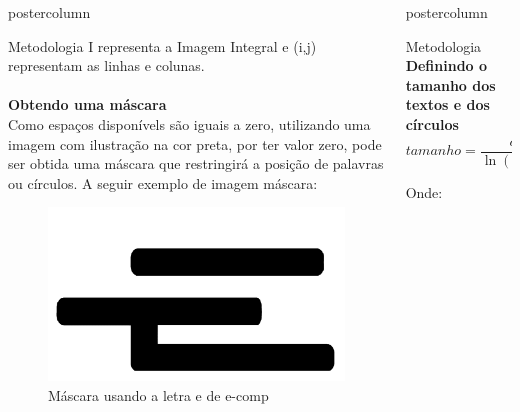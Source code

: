\documentclass[final,hyperref={pdfpagelabels=false}]{beamer}
\newlength{\columnheight}
\begin{document}
\begin{frame}
\begin{columns}
\begin{column}{.49\textwidth}
\begin{beamercolorbox}[center,wd=\textwidth]{postercolumn}
\begin{minipage}[T]{.95\textwidth}
{\begin{block}{Metodologia}
            I representa a Imagem Integral e (i,j) representam as linhas e colunas.\\
            ~\\
            \textbf{Obtendo uma máscara}\\
			Como espaços disponívels são iguais a zero, utilizando uma imagem com ilustração na cor preta, por ter valor zero, pode ser obtida uma máscara que restringirá a posição de palavras ou círculos. A seguir exemplo de imagem máscara:
            \begin{figure}[H]
            \includegraphics[width=0.35\linewidth]{e-comp-24502.pdf}
             \caption{Máscara usando a letra e de e-comp} \label{collaborator}
             \end{figure}
             
            \end{block}
            \vfill
          }
        \end{minipage}
      \end{beamercolorbox}
    \end{column}

    \begin{column}{.49\textwidth}
      \begin{beamercolorbox}[center,wd=\textwidth]{postercolumn}
        \begin{minipage}[T]{.95\textwidth} %
          \parbox[t][\columnheight]{\textwidth}{
          	\begin{block}{Metodologia}
            \textbf{Definindo o tamanho dos textos e dos círculos}\\
              \begin{equation} 
tamanho = \frac{c * ranking}{\ln(ranking + 10)}
\end{equation}

Onde:


\end{block}}
\end{minipage}
\end{beamercolorbox}
\end{column}
\end{columns}
\end{frame}
\end{document}
